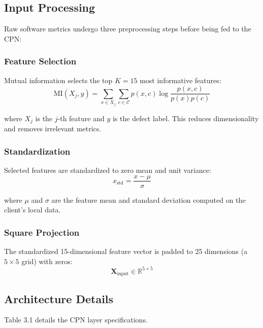 \subsection{Input Processing}

Raw software metrics undergo three preprocessing steps before being fed to the CPN:

\subsubsection{Feature Selection}

Mutual information selects the top \(K = 15\) most informative features:
\[
\text{MI}(X_j, y) = \sum_{x \in X_j} \sum_{c \in \mathcal{C}} p(x, c) \log \frac{p(x, c)}{p(x)p(c)}
\]

where \(X_j\) is the \(j\)-th feature and \(y\) is the defect label. This reduces dimensionality and removes irrelevant metrics.

\subsubsection{Standardization}

Selected features are standardized to zero mean and unit variance:
\[
x_{\text{std}} = \frac{x - \mu}{\sigma}
\]

where \(\mu\) and \(\sigma\) are the feature mean and standard deviation computed on the client's local data.

\subsubsection{Square Projection}

The standardized 15-dimensional feature vector is padded to 25 dimensions (a \(5 \times 5\) grid) with zeros:
\[
\mathbf{X}_{\text{input}} \in \mathbb{R}^{5 \times 5}
\]

\subsection{Architecture Details}

Table 3.1 details the CPN layer specifications.

